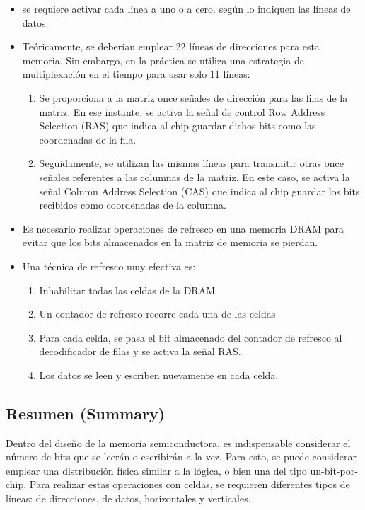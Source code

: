 \documentclass{article}
\begin{document}
\begin{enumerate}
\begin{itemize}
un \emph{\emph{amplificador de lectura}}.
\item[{Para la escritura}] se requiere activar cada línea a uno o a cero.
según lo indiquen las líneas de datos.
\item Teóricamente, se deberían emplear 22 líneas de direcciones para esta
memoria. Sin embargo, en la práctica se utiliza una estrategia de
multiplexación en el tiempo para usar solo 11 líneas:
\begin{enumerate}
\item Se proporciona a la matriz once señales de dirección para las
filas de la matriz. En ese instante, se activa la señal de
control Row Address Selection (RAS) que indica al chip guardar
dichos bits como las coordenadas de la fila.
\item Seguidamente, se utilizan las mismas líneas para transmitir otras
once señales referentes a las columnas de la matriz. En este
caso, se activa la señal Column Address Selection (CAS) que
indica al chip guardar los bits recibidos como coordenadas de la columna.
\end{enumerate}
\item Es necesario realizar operaciones de refresco en una memoria DRAM
para evitar que los bits almacenados en la matriz de memoria se
pierdan.
\item Una técnica de refresco muy efectiva es:
\begin{enumerate}
\item Inhabilitar todas las celdas de la DRAM
\item Un contador de refresco recorre cada una de las celdas
\item Para cada celda, se pasa el bit almacenado del contador de
refresco al decodificador de filas y se activa la señal RAS.
\item Los datos se leen y escriben nuevamente en cada celda.
\end{enumerate}
\end{itemize}
\end{enumerate}

\subsection{Resumen (Summary)}
\label{sec:org1d579c5}
Dentro del diseño de la memoria semiconductora, es indispensable
considerar el número de bits que se leerán o escribirán a la
vez. Para esto, se puede considerar emplear una distribución física
similar a la lógica, o bien una del tipo un-bit-por-chip. Para
realizar estas operaciones con celdas, se requieren diferentes tipos
de líneas: de direcciones, de datos, horizontales y verticales.
\end{document}
